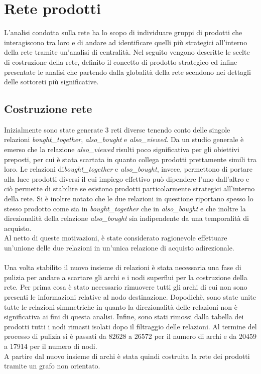 \section{Rete prodotti}\label{ReteProdotti}
L'analisi condotta sulla rete ha lo scopo di individuare gruppi di prodotti che interagiscono tra loro e di andare ad identificare quelli più strategici all'interno della rete tramite un'analisi di centralità. Nel seguito vengono descritte le scelte di costruzione della rete, definito il concetto di prodotto strategico ed infine presentate le analisi che partendo dalla globalità della rete scendono nei dettagli delle sottoreti più significative. 

\subsection{Costruzione rete}
Inizialmente sono state generate 3 reti diverse tenendo conto delle singole relazioni \textit{bought\_together}, \textit{also\_bought} e \textit{also\_viewed}. Da un studio generale è emerso che la relazione \textit{also\_viewed} risulti poco significativa per gli obiettivi preposti, per cui è stata scartata in quanto collega prodotti prettamente simili tra loro. Le relazioni di\textit{bought\_together} e \textit{also\_bought}, invece, permettono di portare alla luce prodotti diversi il cui impiego effettivo può dipendere l'uno dall'altro e ciò permette di stabilire se esistono prodotti particolarmente strategici all'interno della rete. Si è inoltre notato che le due relazioni in questione riportano spesso lo stesso prodotto come sia in \textit{bought\_together} che in \textit{also\_bought} e che inoltre la direzionalità della relazione \textit{also\_bought} sia indipendente da una temporalità di acquisto. \\
Al netto di queste motivazioni, è state considerato ragionevole effettuare un'unione delle due relazioni in un'unica relazione di acquisto adirezionale. 
\\\\
Una volta stabilito il nuovo insieme di relazioni è stata necessaria una fase di pulizia per andare a scartare gli archi e i nodi superflui per la costruzione della rete. Per prima cosa è stato necessario rimuovere tutti gli archi di cui non sono presenti le informazioni relative al nodo destinazione. Dopodichè, sono state unite tutte le relazioni simmetriche in quanto la direzionalità delle relazioni non è significativa ai fini di questa analisi. Infine, sono stati rimossi dalla tabella dei prodotti tutti i nodi rimasti isolati dopo il filtraggio delle relazioni. Al termine del processo di pulizia si è passati da 82628 a 26572 per il numero di archi e da 20459 a 17914 per il numero di nodi. \\
A partire dal nuovo insieme di archi è stata quindi costruita la rete dei prodotti tramite un grafo non orientato.



